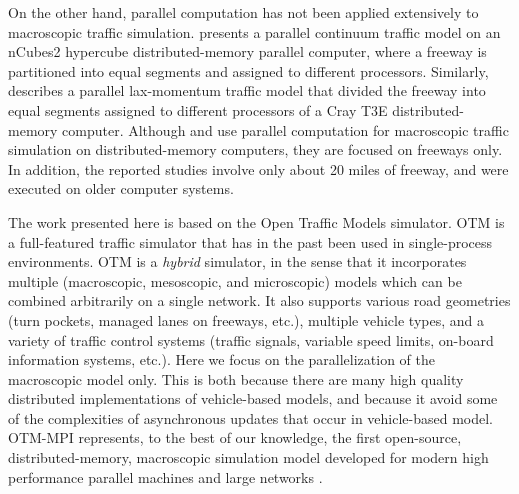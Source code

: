 On the other hand, parallel computation has not been applied extensively to macroscopic traffic simulation. \cite{chronopoulos1998real} presents a parallel continuum traffic model on an nCubes2 hypercube distributed-memory parallel computer, where a freeway is partitioned into equal segments and assigned to different processors. Similarly, \cite{johnston1999parallelization} describes a parallel lax-momentum traffic model that divided the freeway into equal segments assigned to different processors of a Cray T3E distributed-memory computer. Although  \cite{chronopoulos1998real} and \cite{johnston1999parallelization} use parallel computation for macroscopic traffic simulation on distributed-memory computers, they are focused on freeways only. In addition, the reported studies involve only about 20 miles of freeway, and were executed on older computer systems.

The work presented here is based on the Open Traffic Models simulator. OTM is a full-featured traffic simulator that has in the past been used in single-process environments. OTM \cite{Gomes2019OTM} is a \textit{hybrid} simulator, in the sense that it incorporates multiple (macroscopic, mesoscopic, and microscopic) models which can be combined arbitrarily on a single network. It also supports various road geometries (turn pockets, managed lanes on freeways, etc.), multiple vehicle types, and a variety of traffic control systems (traffic signals, variable speed limits, on-board information systems, etc.). Here we focus on the parallelization of the macroscopic model only. This is both because there are many high quality distributed implementations of vehicle-based models, and because it avoid some of the complexities of asynchronous updates that occur in vehicle-based model. OTM-MPI represents, to the best of our knowledge, the first open-source, distributed-memory, macroscopic simulation model developed for modern high performance parallel machines and large networks  \cite{otmmpi}.